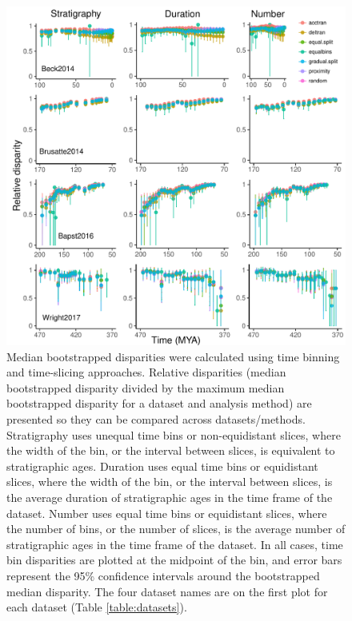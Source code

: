 \documentclass[12pt,a4paper]{article}
\begin{document}
  \begin{figure}[!htbp]
    \centering
    \includegraphics[width=1\linewidth, height=1\textheight, keepaspectratio]{figures/fig-dtt-age-appendix.pdf}
    \caption[Relative disparity through time for four example datasets.]
    {Median bootstrapped disparities were calculated using time binning and time-slicing approaches. 
    Relative disparities (median bootstrapped disparity divided by the maximum median bootstrapped disparity for a dataset and analysis method) are presented so they can be compared across datasets/methods. 
    Stratigraphy uses unequal time bins or non-equidistant slices, where the width of the bin, or the interval between slices, is equivalent to stratigraphic ages. 
    Duration uses equal time bins or equidistant slices, where the width of the bin, or the interval between slices, is the average duration of stratigraphic ages in the time frame of the dataset. 
    Number uses equal time bins or equidistant slices, where the number of bins, or the number of slices, is the average number of stratigraphic ages in the time frame of the dataset. 
    In all cases, time bin disparities are plotted at the midpoint of the bin, and error bars represent the 95\% confidence intervals around the bootstrapped median disparity.
    The four dataset names are on the first plot for each dataset (Table \ref{table:datasets}).}
    \label{figure:dtt3}
  \end{figure}  
\end{document}
